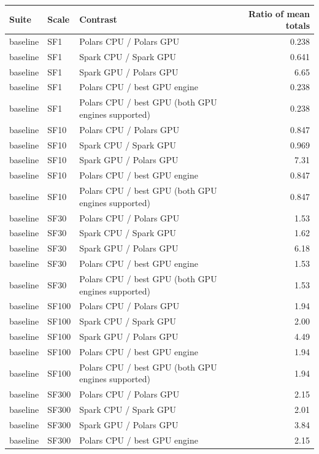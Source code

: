 \begin{tabular}{lllr}
\toprule
Suite & Scale & Contrast & Ratio of mean totals \\
\midrule
baseline & SF1 & Polars CPU / Polars GPU & 0.238 \\
baseline & SF1 & Spark CPU / Spark GPU & 0.641 \\
baseline & SF1 & Spark GPU / Polars GPU & 6.65 \\
baseline & SF1 & Polars CPU / best GPU engine & 0.238 \\
baseline & SF1 & Polars CPU / best GPU (both GPU engines supported) & 0.238 \\
baseline & SF10 & Polars CPU / Polars GPU & 0.847 \\
baseline & SF10 & Spark CPU / Spark GPU & 0.969 \\
baseline & SF10 & Spark GPU / Polars GPU & 7.31 \\
baseline & SF10 & Polars CPU / best GPU engine & 0.847 \\
baseline & SF10 & Polars CPU / best GPU (both GPU engines supported) & 0.847 \\
baseline & SF30 & Polars CPU / Polars GPU & 1.53 \\
baseline & SF30 & Spark CPU / Spark GPU & 1.62 \\
baseline & SF30 & Spark GPU / Polars GPU & 6.18 \\
baseline & SF30 & Polars CPU / best GPU engine & 1.53 \\
baseline & SF30 & Polars CPU / best GPU (both GPU engines supported) & 1.53 \\
baseline & SF100 & Polars CPU / Polars GPU & 1.94 \\
baseline & SF100 & Spark CPU / Spark GPU & 2.00 \\
baseline & SF100 & Spark GPU / Polars GPU & 4.49 \\
baseline & SF100 & Polars CPU / best GPU engine & 1.94 \\
baseline & SF100 & Polars CPU / best GPU (both GPU engines supported) & 1.94 \\
baseline & SF300 & Polars CPU / Polars GPU & 2.15 \\
baseline & SF300 & Spark CPU / Spark GPU & 2.01 \\
baseline & SF300 & Spark GPU / Polars GPU & 3.84 \\
baseline & SF300 & Polars CPU / best GPU engine & 2.15 \\

\end{tabular}
